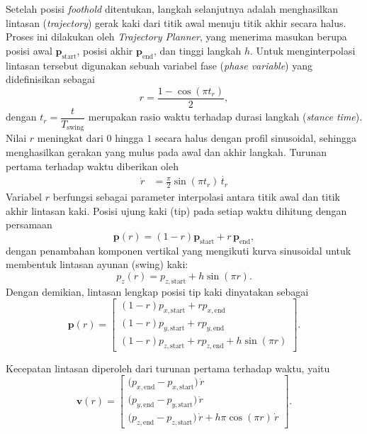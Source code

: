 Setelah posisi \textit{foothold} ditentukan, langkah selanjutnya adalah
menghasilkan lintasan (\textit{trajectory}) gerak kaki dari titik awal menuju
titik akhir secara halus. Proses ini dilakukan oleh \textit{Trajectory Planner},
yang menerima masukan berupa posisi awal $\mathbf{p}_{\text{start}}$, posisi
akhir $\mathbf{p}_{\text{end}}$, dan tinggi langkah $h$. Untuk menginterpolasi
lintasan tersebut digunakan sebuah variabel fase (\textit{phase variable}) yang
didefinisikan sebagai
\begin{equation}
r = \frac{1 - \cos(\pi t_r)}{2},
\label{eq:r_def}
\end{equation}
dengan $t_r = \dfrac{t}{T_\text{swing}}$ merupakan rasio waktu terhadap durasi
langkah (\textit{stance time}). Nilai $r$ meningkat dari $0$ hingga $1$ secara
halus dengan profil sinusoidal, sehingga menghasilkan gerakan yang mulus pada
awal dan akhir langkah. Turunan pertama terhadap waktu diberikan
oleh
\begin{align}
\dot{r} &= \frac{\pi}{2} \sin(\pi t_r) \, \dot{t_r}
\end{align}
Variabel $r$ berfungsi sebagai parameter interpolasi antara titik awal dan
titik akhir lintasan kaki. Posisi ujung kaki (tip) pada setiap waktu dihitung
dengan persamaan
\begin{equation}
\mathbf{p}(r) = (1 - r)\mathbf{p}_{\text{start}} + r\,\mathbf{p}_{\text{end}},
\end{equation}
dengan penambahan komponen vertikal yang mengikuti kurva sinusoidal untuk
membentuk lintasan ayunan (swing) kaki:
\begin{equation}
p_z(r) = p_{z,\text{start}} + h \sin(\pi r).
\end{equation}
Dengan demikian, lintasan lengkap posisi tip kaki dinyatakan sebagai
\begin{equation}
\mathbf{p}(r) = 
\begin{bmatrix}
(1 - r)p_{x,\text{start}} + r p_{x,\text{end}} \\
(1 - r)p_{y,\text{start}} + r p_{y,\text{end}} \\
(1 - r)p_{z,\text{start}} + r p_{z,\text{end}} + h \sin(\pi r)
\end{bmatrix}.
\end{equation}


Kecepatan lintasan diperoleh dari turunan pertama terhadap waktu, yaitu
\begin{equation}
\mathbf{v}(r) =
\begin{bmatrix}
\bigl(p_{x,\text{end}} - p_{x,\text{start}}\bigr)\,\dot{r} \\
\bigl(p_{y,\text{end}} - p_{y,\text{start}}\bigr)\,\dot{r} \\
\bigl(p_{z,\text{end}} - p_{z,\text{start}}\bigr)\,\dot{r} + h\pi\cos(\pi r)\,\dot{r}
\end{bmatrix}.
\label{eq:velocity_component}
\end{equation}

